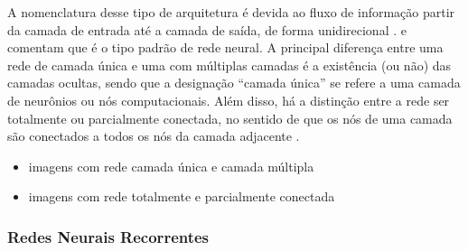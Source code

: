 \documentclass{automatextcc}
\begin{document}


A nomenclatura desse tipo de arquitetura é devida ao fluxo de informação partir da camada de entrada até a camada de saída, de forma unidirecional \citep{goodfellow2016}. \citet{hastie2009} e \citet{fan2021} comentam que é o tipo padrão de rede neural. A principal diferença entre uma rede de camada única e uma com múltiplas camadas é a existência (ou não) das camadas ocultas, sendo que a designação ``camada única'' se refere a uma camada de neurônios ou nós computacionais. Além disso, há a distinção entre a rede ser totalmente ou parcialmente conectada, no sentido de que os nós de uma camada são conectados a todos os nós da camada adjacente \citep{haykin2001}. 

\begin{itemize}
    \item imagens com rede camada única e camada múltipla
    \item imagens com rede totalmente e parcialmente conectada
\end{itemize}

\subsubsection{Redes Neurais Recorrentes}
\end{document}
